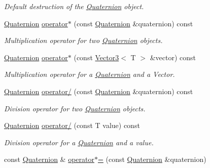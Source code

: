 \begin{DoxyCompactItemize}
\begin{DoxyCompactList}\small\item\em Default destruction of the \hyperlink{classsparky_1_1_quaternion}{Quaternion} object. \end{DoxyCompactList}\item 
\hyperlink{classsparky_1_1_quaternion}{Quaternion} \hyperlink{classsparky_1_1_quaternion_aee719f7d783788a605805b095cb43212}{operator$\ast$} (const \hyperlink{classsparky_1_1_quaternion}{Quaternion} \&quaternion) const 
\begin{DoxyCompactList}\small\item\em Multiplication operator for two \hyperlink{classsparky_1_1_quaternion}{Quaternion} objects. \end{DoxyCompactList}\item 
\hyperlink{classsparky_1_1_quaternion}{Quaternion} \hyperlink{classsparky_1_1_quaternion_a34e3820d2a1fddbc90cdf3e715a6c9c0}{operator$\ast$} (const \hyperlink{classsparky_1_1_vector3}{Vector3}$<$ T $>$ \&vector) const 
\begin{DoxyCompactList}\small\item\em Multiplication operator for a \hyperlink{classsparky_1_1_quaternion}{Quaternion} and a Vector. \end{DoxyCompactList}\item 
\hyperlink{classsparky_1_1_quaternion}{Quaternion} \hyperlink{classsparky_1_1_quaternion_a2a438f46a1204d26bfa79adcdd3d5a85}{operator/} (const \hyperlink{classsparky_1_1_quaternion}{Quaternion} \&quaternion) const 
\begin{DoxyCompactList}\small\item\em Division operator for two \hyperlink{classsparky_1_1_quaternion}{Quaternion} objects. \end{DoxyCompactList}\item 
\hyperlink{classsparky_1_1_quaternion}{Quaternion} \hyperlink{classsparky_1_1_quaternion_af60c38e3048fc7df4737fd9496f5c464}{operator/} (const T value) const 
\begin{DoxyCompactList}\small\item\em Division operator for a \hyperlink{classsparky_1_1_quaternion}{Quaternion} and a value. \end{DoxyCompactList}\item 
const \hyperlink{classsparky_1_1_quaternion}{Quaternion} \& \hyperlink{classsparky_1_1_quaternion_a06be30b3b355d53e8af2a7911f6f5690}{operator$\ast$=} (const \hyperlink{classsparky_1_1_quaternion}{Quaternion} \&quaternion)

\end{DoxyCompactItemize}
